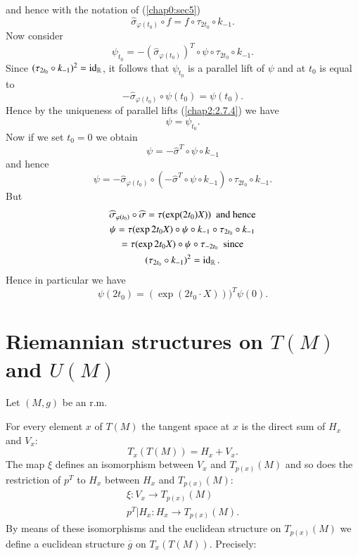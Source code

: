 and hence with the notation of (\ref{chap0:sec5})
$$
\widehat{\sigma}_{\varphi(t_{0})}\circ f=f\circ \tau_{2t_{0}}\circ k_{-1}.
$$
Now \pageoriginale consider
$$
\psi_{t_{0}}=-\left(\widehat{\sigma}_{\varphi(t_{0})}\right)^{T}\circ\psi\circ
\tau_{2t_{0}}\circ k_{-1}.
$$
Since $(\tau_{2t_{0}}\circ k_{-1})^{2}=\operatorname{id}_{\mathbb{R}}$, it follows
that $\psi_{t_{0}}$ is a parallel lift of $\psi$ and at $t_{0}$ is
equal to
$$
-\widehat{\sigma}_{\varphi(t_{0})}\circ \psi(t_{0})=\psi(t_{0}).
$$
Hence by the uniqueness of parallel lifts (\ref{chap2:2.7.4}) we have
$$
\psi=\psi_{t_{0}}.
$$
Now if we set $t_{0}=0$ we obtain
$$
\psi=-\widehat{\sigma}^{T}\circ \psi\circ k_{-1}
$$
and hence
$$
\psi=-\widehat{\sigma}_{\varphi(t_{0})}\circ
(-\widehat{\sigma}^{T}\circ \psi\circ k_{-1})\circ \tau_{2t_{0}}\circ
k_{-1}.
$$
But
\begin{gather*}
\widehat{\sigma}_{\varphi(t_{0})}\circ
\widehat{\sigma}=\tau(\exp(2t_{0})X))\text{ \ and hence}\\
\psi=\tau(\exp 2t_{0}X)\circ \psi\circ k_{-1}\circ \tau_{2t_{0}}\circ
k_{-1}\\
=\tau(\exp 2t_{0}X)\circ \psi\circ \tau_{-2t_{0}}\text{ \  since}\\
(\tau_{2t_{0}}\circ k_{-1})^{2}=\operatorname{id}_{\mathbb{R}}.
\end{gather*}
Hence in particular we have
$$
\psi(2t_{0})=(\exp(2t_{0}\cdot X)))^{T}\psi(0).
$$

\section{Riemannian structures on {${{T(M)}}$} and
  {${{U(M)}}$}}\label{chap5:sec2}\pageoriginale

Let $(M,g)$ be an r.m.

For every element $x$ of $T(M)$ the tangent space at $x$ is the direct
sum of $H_{x}$ and $V_{x}$:
$$
T_{x}(T(M))=H_{x}+V_{x}.
$$
The map $\xi$ defines an isomorphism between $V_{x}$ and $T_{p(x)}(M)$
and so does the restriction of $p^{T}$ to $H_{x}$ between $H_{x}$ and
$T_{p(x)}(M)$:
\begin{gather*}
\xi:V_{x}\to T_{p(x)}(M)\\
p^{T}|H_{x}:H_{x}\to T_{p(x)}(M).
\end{gather*}
By means of these isomorphisms and the euclidean structure on\break
$T_{p(x)}(M)$ we define a euclidean structure $\overline{g}$ on
$T_{x}(T(M))$. Precisely:

\subsection{}\label{chap5:5.2.1}

